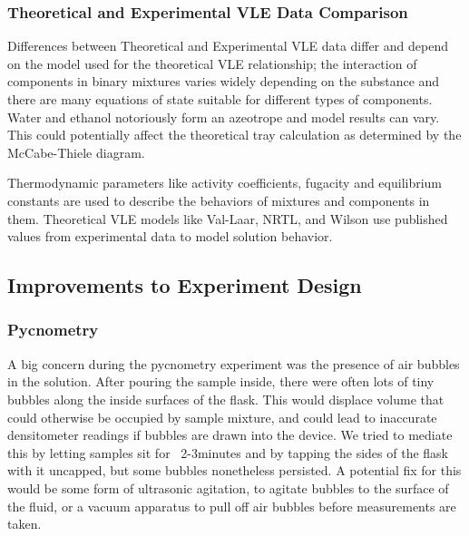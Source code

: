 \documentclass[lettersize,journal]{IEEEtran}
\begin{document}
\subsubsection{Theoretical and Experimental VLE Data Comparison}
Differences between Theoretical and Experimental VLE data differ and depend on the model used for the theoretical VLE relationship; the interaction of components in binary mixtures varies widely depending on the substance and there are many equations of state suitable for different types of components. Water and ethanol notoriously form an azeotrope and model results can vary. This could potentially affect the theoretical tray calculation as determined by the McCabe-Thiele diagram. 

Thermodynamic parameters like activity coefficients, fugacity and equilibrium constants are used to describe the behaviors of mixtures and components in them. Theoretical VLE models like Val-Laar, NRTL, and Wilson use published values from experimental data to model solution behavior.
\subsection{Improvements to Experiment Design}
\subsubsection{Pycnometry}
A big concern during the pycnometry experiment was the presence of air bubbles in the solution. After pouring the sample inside, there were often lots of tiny bubbles along the inside surfaces of the flask. This would displace volume that could otherwise be occupied by sample mixture, and could lead to inaccurate densitometer readings if bubbles are drawn into the device. We tried to mediate this by letting samples sit for ~2-3minutes and by tapping the sides of the flask with it uncapped, but some bubbles nonetheless persisted. A potential fix for this would be some form of ultrasonic agitation, to agitate bubbles to the surface of the fluid, or a vacuum apparatus to pull off air bubbles before measurements are taken.
\end{document}
